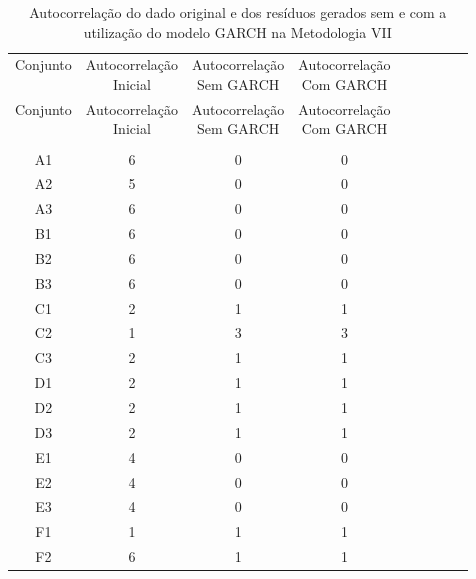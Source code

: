 \begin{center}
\begin{longtable}{ccccc|cccc}
\toprule
\rowcolor{white}
\caption[Metodologia VII: evolução da autocorrelação]{Autocorrelação do dado
original e dos resíduos gerados sem e com a utilização do modelo GARCH na
Metodologia VII} \label{tab:EvolucaoAutocorrelacaoMet7}\\
\midrule
Conjunto & \specialcell{Autocorrelação\\Inicial} & \specialcell{Autocorrelação\\Sem
GARCH} & \specialcell{Autocorrelação\\Com GARCH} \\
\midrule
\endfirsthead 
\midrule
\rowcolor{white}
Conjunto & \specialcell{Autocorrelação\\Inicial} & \specialcell{Autocorrelação\\Sem
GARCH} & \specialcell{Autocorrelação\\Com GARCH} \\
\toprule
\endhead
\midrule \\ %
\endfoot
\bottomrule 
\endlastfoot
    A1    & 6     & 0     & 0 \\
    A2    & 5     & 0     & 0 \\
    A3    & 6     & 0     & 0 \\
    B1    & 6     & 0     & 0 \\
    B2    & 6     & 0     & 0 \\
    B3    & 6     & 0     & 0 \\
    C1    & 2     & 1     & 1 \\
    C2    & 1     & 3     & 3 \\
    C3    & 2     & 1     & 1 \\
    D1    & 2     & 1     & 1 \\
    D2    & 2     & 1     & 1 \\
    D3    & 2     & 1     & 1 \\
    E1    & 4     & 0     & 0 \\
    E2    & 4     & 0     & 0 \\
    E3    & 4     & 0     & 0 \\
    F1    & 1     & 1     & 1 \\
    F2    & 6     & 1     & 1 \\

\end{longtable}
\end{center}
